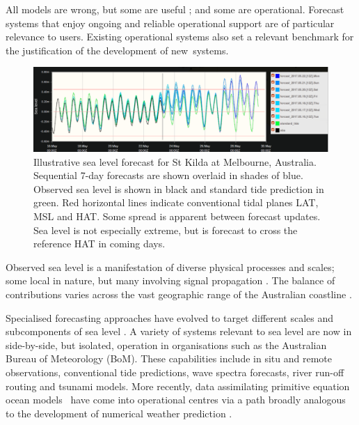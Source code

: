 All models are wrong, but some are useful \cite{Box:1979wz}; and some are operational.        %
Forecast systems that enjoy ongoing and reliable operational support are of particular relevance to users.
Existing operational systems also set a relevant benchmark for the justification of the development of new~systems.  

\begin{figure}[H]
\centering
\includegraphics[width=1\textwidth]{figures/plots/forecast_eg.png}
\caption{Illustrative sea level forecast for St Kilda at Melbourne, Australia.  Sequential 7-day forecasts are shown overlaid in shades of blue.  Observed sea level is shown in black and standard tide prediction in green.  Red horizontal lines indicate conventional tidal planes LAT, MSL and HAT.  Some spread is apparent between forecast updates.  Sea level is not especially extreme, but is forecast to cross the reference HAT in coming days.}
\label{fig:fc_eg}
\end{figure}   


Observed sea level is a manifestation of diverse physical processes and scales; some local in nature, but many involving signal propagation \cite{Anonymous:jdDiSHB0}.
The balance of contributions varies across the vast geographic range of the Australian coastline \cite{Haigh:2013bna,Haigh:2013hea,Woodham:2013cl,Ridgway:2004kb,Church:1986tl,Allen:2009tf}.

Specialised forecasting approaches have evolved to target different scales and subcomponents of sea level \cite{Cartwright:2000tt,Petersen:2012kp}.
A variety of systems relevant to sea level are now in side-by-side, but isolated, operation in organisations such as the Australian Bureau of Meteorology (BoM). 
These capabilities include in situ and remote observations, conventional tide predictions, wave spectra forecasts, river run-off routing and tsunami models. 
More recently, data assimilating primitive equation ocean models~\cite{Schiller:2011di} have come into operational centres via a path broadly analogous to the development of numerical weather prediction \cite{Harper:kb}. 

